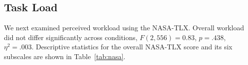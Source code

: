 \documentclass[acmlarge,review=true, anonymous=true]{acmart}
\begin{document}





\subsection{Task Load}

We next examined perceived workload using the NASA-TLX. Overall workload did not differ significantly across conditions, $F(2, 556) = 0.83$, $p = .438$, $\eta^2 = .003$. Descriptive statistics for the overall NASA-TLX score and its six subscales are shown in Table~\ref{tab:nasa}.
\end{document}
